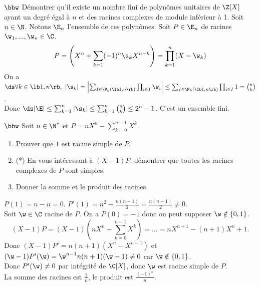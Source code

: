 \documentclass[11pt]{article}
\begin{document}
\pagebreak 

\begin{exercice}{$\bbw$}{}
    Démontrer qu'il existe un nombre fini de polynômes unitaires de $\Z[X]$ ayant un degré égal à $n$ et des racines complexes de module inférieur à 1.
    \tcblower
    Soit $n\in\N$. Notons $\E_n$ l'ensemble de ces polynômes. Soit $P\in\E_n$ de racines $\w_1,...,\w_n\in\C$.
    \begin{equation*}
        P=\left( X^n + \sum_{k=1}(-1)^n\s_k X^{n-k} \right) = \prod_{k=1}^n(X-\w_k)
    \end{equation*}
    On a $\ds\forall k \in \lb 1, n\rb, ~ |\s_k|=\left|\sum_{I\in\P_k(\lb1,n\rb)}\prod_{i\in I}\w_i\right|\leq\sum_{I\in\P_k(\lb1,n\rb)}\prod_{i\in I}1=\binom{n}{k}$.\\
    Donc $\ds|\E|\leq\sum_{k=1}^n|\s_k|\leq\sum_{k=1}^n\binom{n}{k}\leq2^n-1$. C'est un ensemble fini.
\end{exercice}

\vspace*{-0.4cm}

\begin{exercice}{$\bbw$}{}
    Soit $n\in\N^*$ et $P=nX^n-\sum\limits_{k=0}^{n-1}X^k$.
    \begin{enumerate}
        \item Prouver que $1$ est racine simple de $P$.
        \item (*) En vous intéressant à $(X-1)P$, démontrer que toutes les racines complexes de $P$ sont simples.
        \item Donner la somme et le produit des racines.
    \end{enumerate}
    \tcblower
     $P(1)=n-n=0$. $P'(1)=n^2-\frac{n(n-1)}{2}=\frac{n(n-1)}{2}\neq0$.\\
     Soit $\w\in\C$ racine de $P$. On a $P(0)=-1$ donc on peut supposer $\w\notin\{0,1\}$.
    \begin{equation*}
        (X-1)P=(X-1)(nX^n - \sum_{k=0}^{n-1}X^k)=...=nX^{n+1}-(n+1)X^n+1.
    \end{equation*}
    Donc $(X-1)P'=n(n+1)(X^n-X^{n-1})$ et $(\w-1)P'(\w)=\w^{n-1}n(n+1)(\w-1)\neq0$ car $\w\notin\{0,1\}$.\\
    Donc $P'(\w)\neq0$ par intégrité de $\C[X]$, donc $\w$ est racine simple de $P$.\\
     La somme des racines est $\frac{1}{n}$, le produit est $\frac{(-1)^n}{n}$.
\end{exercice}
\end{document}
